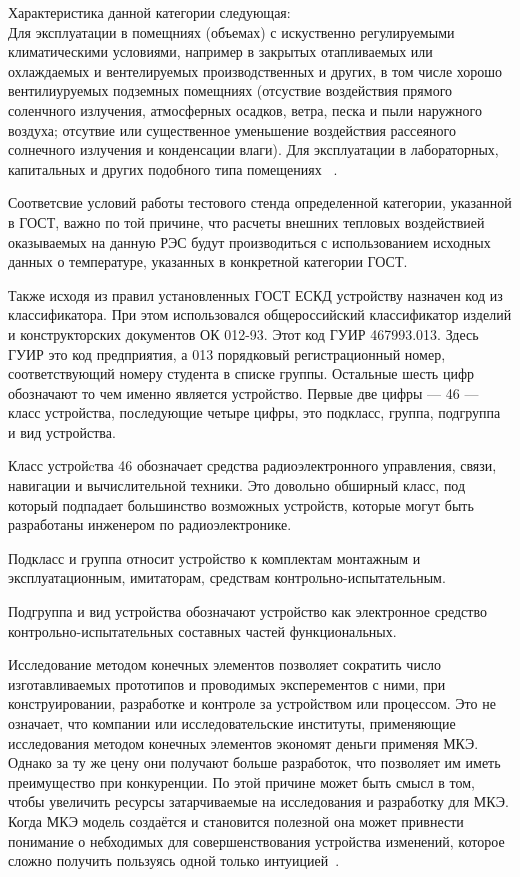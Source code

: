 Характеристика данной категории следующая:\\
Для эксплуатации в помещниях (объемах) с искуственно регулируемыми
климатическими условиями, например в закрытых отапливаемых или
охлаждаемых и вентелируемых производственных и других, в том числе
хорошо вентилиуруемых подземных помещниях (отсуствие воздействия
прямого соленчного излучения, атмосферных осадков, ветра, песка и пыли
наружного воздуха; отсутвие или существенное уменьшение воздействия
рассеяного солнечного излучения и конденсации влаги). Для эксплуатации
в лабораторных, капитальных и других подобного типа помещениях ~\cite{GOST-15150-69}.

Соответсвие условий работы тестового стенда определенной категории,
указанной в ГОСТ, важно по той причине,
что расчеты внешних тепловых воздействией оказываемых на данную РЭС будут производиться с использованием исходных данных о температуре,
указанных в конкретной категории ГОСТ.


Также исходя из правил установленных ГОСТ ЕСКД устройству назначен код из классификатора.
При этом использовался общероссийский классификатор изделий и конструкторских документов ОК 012-93.
Этот код ГУИР 467993.013. Здесь ГУИР это код предприятия, а 013 порядковый регистрационный номер,
соответствующий номеру студента в списке группы.
Остальные шесть цифр обозначают то чем именно является устройство.
Первые две цифры — 46 — класс устройства, последующие четыре цифры,
это подкласс, группа, подгруппа и вид устройства.

Класс устройcтва 46 обозначает средства радиоэлектронного управления, связи, навигации и вычислительной техники.
Это довольно обширный класс, под который подпадает большинство возможных устройств,
которые могут быть разработаны инженером по радиоэлектронике.

Подкласс и группа относит устройство к комплектам монтажным и эксплуатационным,
имитаторам,
средствам контрольно-испытательным.

Подгруппа и вид устройства обозначают устройство как электронное средство контрольно-испытательных составных частей функциональных.

Исследование методом конечных элементов
позволяет сократить число изготавливаемых прототипов и проводимых эксперементов с ними,
при конструировании, разработке и контроле за устройством или процессом.
Это не означает, что компании или исследовательские институты,
применяющие исследования методом конечных элементов экономят деньги применяя МКЭ.
Однако за ту же цену они получают больше разработок,
что позволяет им иметь преимущество при конкуренции.
По этой причине может быть смысл в том,
чтобы увеличить ресурсы затарчиваемые на исследования и разработку для МКЭ.
Когда МКЭ модель создаётся и становится полезной она может привнести
понимание о небходимых для совершенствования устройства изменений,
которое сложно получить пользуясь одной только интуицией~\cite{MULTIPHYSICS-CYCLOPEDIA-FEM}.


